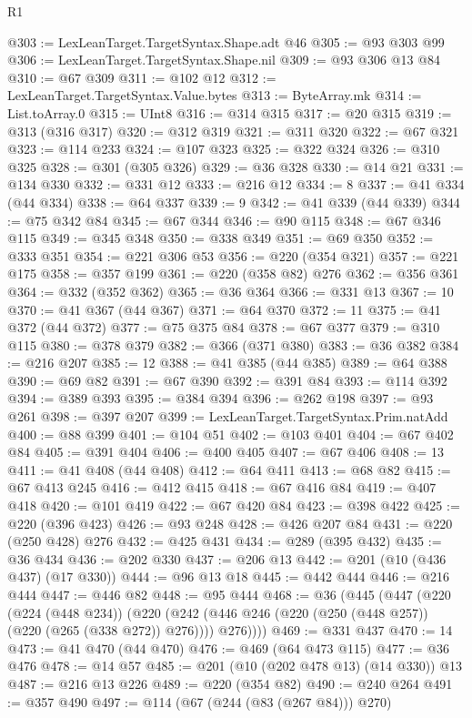 \begin{lexlean}{R1}
\begin{coremodule}
@303 := LexLeanTarget.TargetSyntax.Shape.adt @46
@305 := @93 @303 @99
@306 := LexLeanTarget.TargetSyntax.Shape.nil
@309 := @93 @306 @13 @84
@310 := @67 @309
@311 := @102 @12
@312 := LexLeanTarget.TargetSyntax.Value.bytes
@313 := ByteArray.mk
@314 := List.toArray.{0}
@315 := UInt8
@316 := @314 @315
@317 := @20 @315
@319 := @313 (@316 @317)
@320 := @312 @319
@321 := @311 @320
@322 := @67 @321
@323 := @114 @233
@324 := @107 @323
@325 := @322 @324
@326 := @310 @325
@328 := @301 (@305 @326)
@329 := @36 @328
@330 := @14 @21
@331 := @134 @330
@332 := @331 @12
@333 := @216 @12
@334 := 8
@337 := @41 @334 (@44 @334)
@338 := @64 @337
@339 := 9
@342 := @41 @339 (@44 @339)
@344 := @75 @342 @84
@345 := @67 @344
@346 := @90 @115
@348 := @67 @346 @115
@349 := @345 @348
@350 := @338 @349
@351 := @69 @350
@352 := @333 @351
@354 := @221 @306 @53
@356 := @220 (@354 @321)
@357 := @221 @175
@358 := @357 @199
@361 := @220 (@358 @82) @276
@362 := @356 @361
@364 := @332 (@352 @362)
@365 := @36 @364
@366 := @331 @13
@367 := 10
@370 := @41 @367 (@44 @367)
@371 := @64 @370
@372 := 11
@375 := @41 @372 (@44 @372)
@377 := @75 @375 @84
@378 := @67 @377
@379 := @310 @115
@380 := @378 @379
@382 := @366 (@371 @380)
@383 := @36 @382
@384 := @216 @207
@385 := 12
@388 := @41 @385 (@44 @385)
@389 := @64 @388
@390 := @69 @82
@391 := @67 @390
@392 := @391 @84
@393 := @114 @392
@394 := @389 @393
@395 := @384 @394
@396 := @262 @198
@397 := @93 @261
@398 := @397 @207
@399 := LexLeanTarget.TargetSyntax.Prim.natAdd
@400 := @88 @399
@401 := @104 @51
@402 := @103 @401
@404 := @67 @402 @84
@405 := @391 @404
@406 := @400 @405
@407 := @67 @406
@408 := 13
@411 := @41 @408 (@44 @408)
@412 := @64 @411
@413 := @68 @82
@415 := @67 @413 @245
@416 := @412 @415
@418 := @67 @416 @84
@419 := @407 @418
@420 := @101 @419
@422 := @67 @420 @84
@423 := @398 @422
@425 := @220 (@396 @423)
@426 := @93 @248
@428 := @426 @207 @84
@431 := @220 (@250 @428) @276
@432 := @425 @431
@434 := @289 (@395 @432)
@435 := @36 @434
@436 := @202 @330
@437 := @206 @13
@442 := @201 (@10 (@436 @437) (@17 @330))
@444 := @96 @13 @18
@445 := @442 @444
@446 := @216 @444
@447 := @446 @82
@448 := @95 @444
@468 := @36
    (@445
      (@447
        (@220
          (@224 (@448 @234))
          (@220 (@242 (@446 @246 (@220 (@250 (@448 @257)) (@220 (@265 (@338 @272)) @276)))) @276))))
@469 := @331 @437
@470 := 14
@473 := @41 @470 (@44 @470)
@476 := @469 (@64 @473 @115)
@477 := @36 @476
@478 := @14 @57
@485 := @201 (@10 (@202 @478 @13) (@14 @330)) @13
@487 := @216 @13 @226
@489 := @220 (@354 @82)
@490 := @240 @264
@491 := @357 @490
@497 := @114 (@67 (@244 (@83 (@267 @84))) @270)

\end{coremodule}
\end{lexlean}
